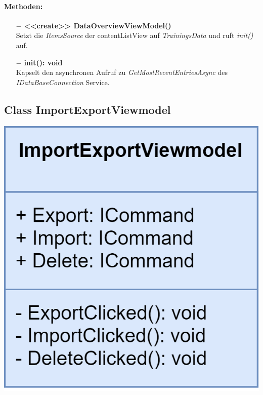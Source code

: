 \documentclass[a4paper,12pt]{article}
\begin{document}
\paragraph{Methoden:}
\begin{itemize}
    \item[$-$] \textbf{<<create>> DataOverviewViewModel()} \\ Setzt die \textit{ItemsSource} der contentListView auf \textit{TrainingsData} und ruft \textit{init()} auf.
    \item[$-$] \textbf{init(): void} \\ Kapselt den asynchronen Aufruf zu \textit{GetMostRecentEntriesAsync} des \textit{IDataBaseConnection} Service.
\end{itemize} 

\begin{minipage}[t]{0.7\textwidth}

	\subsection{Class ImportExportViewmodel}

\end{minipage}
\begin{minipage}[c]{0.3\textwidth}
	\includegraphics[width=\textwidth]{bilder/ViewmodelKlassen/ImportExportViewmodel}
\end{minipage}
\end{document}
